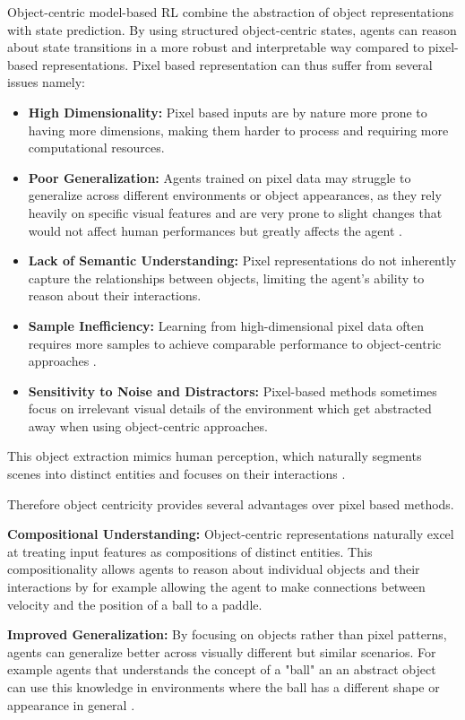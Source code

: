 \documentclass[
	english,
	ruledheaders=section,
	class=report,
	thesis={type=master},
	accentcolor=9c,
	custommargins=true,
	marginpar=false,
	parskip=half-,
	fontsize=11pt,
]{tudapub}
\begin{document}
Object-centric model-based RL combine the abstraction of object representations
with state prediction. By using structured object-centric states, agents can
reason about state transitions in a more robust and interpretable way compared
to pixel-based representations. Pixel based representation can thus suffer from
several issues namely:

\begin{itemize}
	\item \textbf{High Dimensionality:} Pixel based inputs are by nature more prone to having more dimensions, making them harder to process and requiring more computational resources.
	\item \textbf{Poor Generalization:} Agents trained on pixel data may struggle to generalize across different environments or object appearances, as they rely heavily on specific visual features and are very prone to slight changes that would not affect human performances but greatly affects the agent \cite{zhang2020learning,stone2021distracting}.
	\item \textbf{Lack of Semantic Understanding:} Pixel representations do not inherently capture the relationships between objects, limiting the agent's ability to reason about their interactions.
	\item \textbf{Sample Inefficiency:} Learning from high-dimensional pixel data often requires more samples to achieve comparable performance to object-centric approaches \cite{watters2019cobra}.
	\item \textbf{Sensitivity to Noise and Distractors:} Pixel-based methods sometimes focus on irrelevant visual details of the environment which get abstracted away when using object-centric approaches.
\end{itemize}

This object extraction mimics human perception, which naturally segments scenes
into distinct entities and focuses on their interactions
\cite{spelke2007core,greff2020object}.

Therefore object centricity provides several advantages over pixel based
methods.

\textbf{Compositional Understanding:} Object-centric representations naturally excel at treating input features as compositions of distinct entities.
This compositionality allows agents to reason about individual objects and their interactions by for example allowing the agent
to make connections between velocity and the position of a ball to a paddle.

\textbf{Improved Generalization:} By focusing on objects rather than pixel patterns, agents can generalize better across visually different but similar scenarios. For example agents that
understands the concept of a "ball" an an abstract object can use this knowledge in environments where the ball has a different shape or appearance in general \cite{zambaldi2018deep}.
\end{document}
